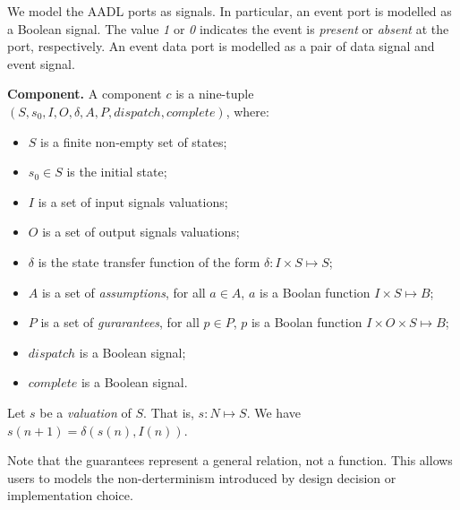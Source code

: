 We model the AADL ports as signals. In particular, an event port is modelled as a Boolean signal. The value \emph{1} or \emph{0} indicates the event is \emph{present} or \emph{absent} at the port, respectively. 
An event data port is modelled as a pair of data signal and event signal.  %

{\bf Component.}
A component $c$ is a nine-tuple $(S, s_0, I, O, \delta, A, P, dispatch, complete)$, where: 
\begin{itemize}
    	\item $S$ is a finite non-empty set of states;
    	\item $s_0 \in S$ is the initial state;
    	\item $I$ is a set of input signals valuations;
    	\item $O$ is a set of output signals valuations;
    	\item $\delta$ is the state transfer function of the form $\delta: I \times S \mapsto S$;
    	\item $A$ is a set of \emph{assumptions}, for all $a \in A$, $a$ is a Boolan function $I \times S \mapsto B$;
    	\item $P$ is a set of \emph{gurarantees}, for all $p \in P$, $p$ is a Boolan function $I \times O \times S \mapsto B$;
    	\item $dispatch$ is a Boolean signal;
	\item $complete$ is a Boolean signal.
\end{itemize}

Let $s$ be a \emph{valuation} of $S$. That is, $s: N \mapsto S$. We have $ s(n+1) = \delta (s(n), I(n))$.

Note that the guarantees represent a general relation, not a function. This allows users to models the non-derterminism introduced by design decision or implementation choice.
  

